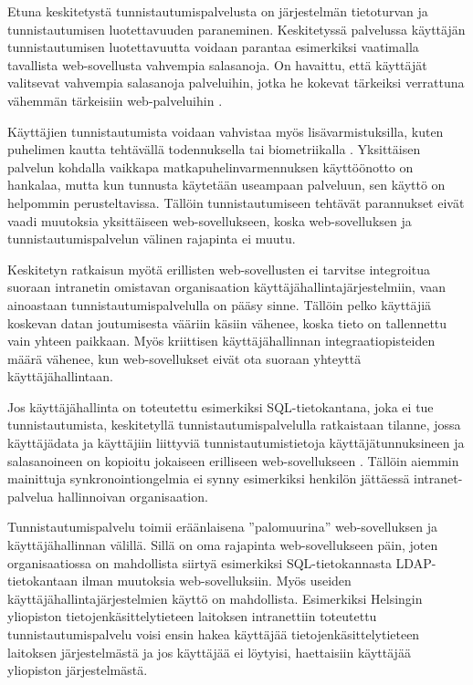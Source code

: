 Etuna keskitetystä tunnistautumispalvelusta on järjestelmän tietoturvan ja tunnistautumisen luotettavuuden paraneminen. Keskitetyssä palvelussa käyttäjän tunnistautumisen luotettavuutta voidaan parantaa esimerkiksi vaatimalla tavallista web-sovellusta vahvempia salasanoja. On havaittu, että käyttäjät valitsevat vahvempia salasanoja palveluihin, jotka he kokevat tärkeiksi verrattuna vähemmän tärkeisiin web-palveluihin \cite{password_habits}.

Käyttäjien tunnistautumista voidaan vahvistaa myös lisävarmistuksilla, kuten puhelimen kautta tehtävällä todennuksella tai biometriikalla \cite{nisti}. Yksittäisen palvelun kohdalla vaikkapa matkapuhelinvarmennuksen käyttöönotto on hankalaa, mutta kun tunnusta käytetään useampaan palveluun, sen käyttö on helpommin perusteltavissa. Tällöin tunnistautumiseen tehtävät parannukset eivät vaadi muutoksia yksittäiseen web-sovellukseen, koska web-sovelluksen ja tunnistautumispalvelun välinen rajapinta ei muutu.

Keskitetyn ratkaisun myötä erillisten web-sovellusten ei tarvitse integroitua suoraan intranetin omistavan organisaation käyttäjähallintajärjestelmiin, vaan ainoastaan tunnistautumispalvelulla on pääsy sinne. Tällöin pelko käyttäjiä koskevan datan joutumisesta vääriin käsiin vähenee, koska tieto on tallennettu vain yhteen paikkaan. Myös kriittisen käyttäjähallinnan integraatiopisteiden määrä vähenee, kun web-sovellukset eivät ota suoraan yhteyttä käyttäjähallintaan.

Jos käyttäjähallinta on toteutettu esimerkiksi SQL-tietokantana, joka ei tue tunnistautumista, keskitetyllä tunnistautumispalvelulla ratkaistaan tilanne, jossa käyttäjädata ja käyttäjiin liittyviä tunnistautumistietoja käyttäjätunnuksineen ja salasanoineen on kopioitu jokaiseen erilliseen web-sovellukseen \cite{billion_keys}. Tällöin aiemmin mainittuja synkronointiongelmia ei synny esimerkiksi henkilön jättäessä intranet-palvelua hallinnoivan organisaation.

Tunnistautumispalvelu toimii eräänlaisena ''palomuurina'' web-sovelluksen ja käyttäjähallinnan välillä. Sillä on oma rajapinta web-sovellukseen päin, joten organisaatiossa on mahdollista siirtyä esimerkiksi SQL-tietokannasta LDAP-tietokantaan ilman muutoksia web-sovelluksiin. Myös useiden käyttäjähallintajärjestelmien käyttö on mahdollista. Esimerkiksi Helsingin yliopiston tietojenkäsittelytieteen laitoksen intranettiin toteutettu tunnistautumispalvelu voisi ensin hakea käyttäjää tietojenkäsittelytieteen laitoksen järjestelmästä ja jos käyttäjää ei löytyisi, haettaisiin käyttäjää yliopiston järjestelmästä.


